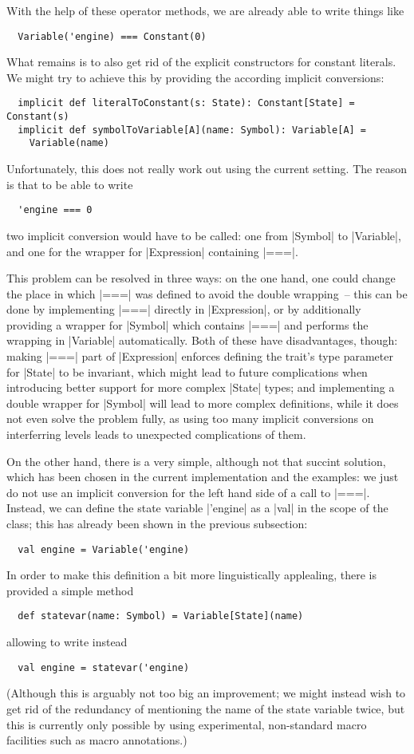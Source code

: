 With the help of these operator methods, we are already able to write things like 
\begin{lstlisting}
  Variable('engine) === Constant(0)
\end{lstlisting}
What remains is to also get rid of the explicit constructors for constant literals. We might try to
achieve this by providing the according implicit conversions:
\begin{lstlisting}
  implicit def literalToConstant(s: State): Constant[State] = Constant(s)
  implicit def symbolToVariable[A](name: Symbol): Variable[A] = 
    Variable(name)
\end{lstlisting}
Unfortunately, this does not really work out using the current setting. The reason is that to be
able to write
\begin{lstlisting}
  'engine === 0
\end{lstlisting}
two implicit conversion would have to be called: one from |Symbol| to |Variable|, and one for the
wrapper for |Expression| containing |===|.

This problem can be resolved in three ways: on the one hand, one could change the place in
which |===| was defined to avoid the double wrapping~-- this can be done by implementing |===|
directly in |Expression|, or by additionally providing a wrapper for |Symbol| which contains |===|
and performs the wrapping in |Variable| automatically. Both of these have disadvantages, though:
making |===| part of |Expression| enforces defining the trait's type parameter for |State| to be
invariant, which might lead to future complications when introducing better support for more complex
|State| types; and implementing a double wrapper for |Symbol| will lead to more complex definitions,
while it does not even solve the problem fully, as using too many implicit conversions on
interferring levels leads to unexpected complications of them.

On the other hand, there is a very simple, although not that succint solution, which has been
chosen in the current implementation and the examples: we just do not use an implicit conversion for
the left hand side of a call to |===|. Instead, we can define the state variable |'engine| as a
|val| in the scope of the class; this has already been shown in the previous subsection:
\begin{lstlisting}
  val engine = Variable('engine)  
\end{lstlisting}
In order to make this definition a bit more linguistically applealing, there is provided a simple
method
\begin{lstlisting}
  def statevar(name: Symbol) = Variable[State](name)
\end{lstlisting}
allowing to write instead
\begin{lstlisting}
  val engine = statevar('engine)
\end{lstlisting}
(Although this is arguably not too big an improvement; we might instead wish to get rid of the
redundancy of mentioning the name of the state variable twice, but this is currently only possible
by using experimental, non-standard macro facilities such as macro annotations.)

